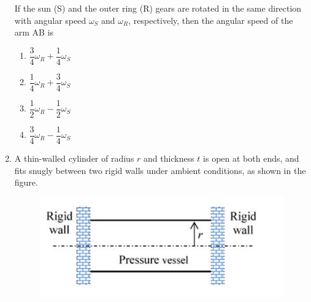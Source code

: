 \documentclass[12pt,onecolumn]{article}
\begin{document}
\begin{enumerate}
          If the sun (S) and the outer ring (R) gears are rotated in the same direction with angular speed $\omega_S$ and $\omega_R$, respectively, then the angular speed of the arm AB is
          \begin{enumerate}
              \item $\dfrac{3}{4}\omega_R + \dfrac{1}{4}\omega_S$
              \item $\dfrac{1}{4}\omega_R + \dfrac{3}{4}\omega_S$
              \item $\dfrac{1}{2}\omega_R - \dfrac{1}{2}\omega_S$
              \item $\dfrac{3}{4}\omega_R - \dfrac{1}{4}\omega_S$
          \end{enumerate}

    \item A thin-walled cylinder of radius $r$ and thickness $t$ is open at both ends, and fits snugly between two rigid walls under ambient conditions, as shown in the figure.

          \begin{figure}[H]
              \centering
              \includegraphics[scale=0.4]{q30s2}
              \label{fig:q30s2}
          \end{figure}


\end{enumerate}
\end{document}

